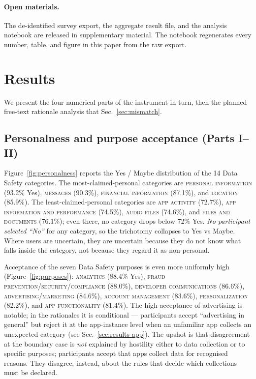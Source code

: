 \documentclass[11pt,a4paper]{article}
\makeatletter
\let\@oldsection\section
\renewcommand{\section}{\FloatBarrier\@oldsection}
\makeatother
\begin{document}
\paragraph{Open materials.}
The de-identified survey export, the aggregate result file, and the
analysis notebook are released in supplementary material. The
notebook regenerates every number, table, and figure in this paper
from the raw export.

\section{Results}\label{sec:results}

We present the four numerical parts of the instrument in turn, then
the planned free-text rationale analysis that
Sec.~\ref{sec:mismatch}.

\subsection{Personalness and purpose acceptance (Parts I--II)}
\label{sec:results-cat}

Figure~\ref{fig:personalness} reports the Yes / Maybe distribution
of the 14 Data Safety categories. The most-claimed-personal
categories are \textsc{personal information} (93.2\% Yes),
\textsc{messages} (90.3\%), \textsc{financial information} (87.1\%),
and \textsc{location} (85.9\%). The least-claimed-personal
categories are \textsc{app activity} (72.7\%), \textsc{app
information and performance} (74.5\%), \textsc{audio files}
(74.6\%), and \textsc{files and documents} (76.1\%); even there, no
category drops below 72\% Yes. \emph{No participant selected
``No''} for any category, so the trichotomy collapses to Yes vs
Maybe. Where users are uncertain, they are uncertain because they
do not know what falls inside the category, not because they regard
it as non-personal.



Acceptance of the seven Data Safety purposes is even more uniformly
high (Figure~\ref{fig:purposes}): \textsc{analytics} (88.4\% Yes),
\textsc{fraud prevention/security/compliance} (88.0\%),
\textsc{developer communications} (86.6\%),
\textsc{advertising/marketing} (84.6\%), \textsc{account
management} (83.6\%), \textsc{personalization} (82.2\%), and
\textsc{app functionality} (81.4\%). The high acceptance of
advertising is notable; in the rationales it is conditional ---
participants accept ``advertising in general'' but reject it at the
app-instance level when an unfamiliar app collects an unexpected
category (see Sec.~\ref{sec:results-app}). The upshot is that
disagreement at the boundary case is \emph{not} explained by
hostility either to data collection or to specific purposes;
participants accept that apps collect data for recognised reasons.
They disagree, instead, about the rules that decide which
collections must be declared.
\end{document}
